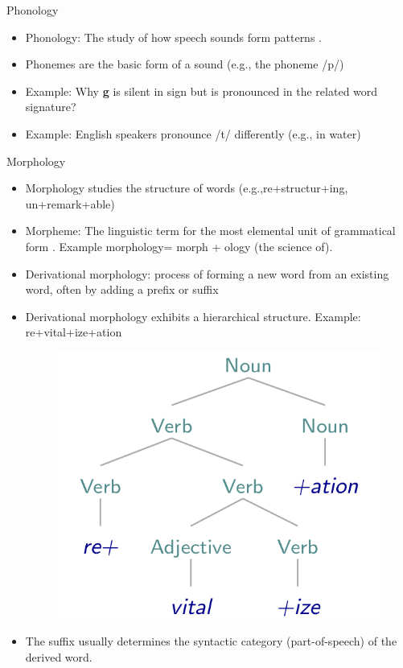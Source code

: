 \documentclass[handout]{beamer}
\begin{document}
\begin{frame}{Phonology}
\scriptsize{
\begin{itemize}
\item Phonology: The study of how speech sounds form patterns \cite{fromkin2018introduction}.
\item Phonemes are  the basic form of a sound (e.g., the phoneme /p/)
\item Example: Why \textbf{g} is silent in sign but is pronounced in the related word signature?
\item Example: English speakers pronounce /t/ differently (e.g., in water)
 
\end{itemize}
}
\end{frame}




\begin{frame}{Morphology}
\scriptsize{


\begin{itemize}
\item Morphology studies the structure of words (e.g.,re+structur+ing, un+remark+able) \cite{JohnsonMLSS}  
\item Morpheme: The linguistic term for the most elemental unit of grammatical form \cite{fromkin2018introduction}. Example morphology= morph + ology (the science of).
\item Derivational morphology: process of forming a new word from an existing word, often by adding a prefix or suffix 
\item Derivational morphology exhibits a hierarchical structure. Example: re+vital+ize+ation
     \begin{figure}[h]
        	\includegraphics[scale = 0.2]{pics/morphology.png}
        \end{figure}
\item The suffix usually determines the syntactic category (part-of-speech) of the derived word.        
\end{itemize}

}


\end{frame}
\end{document}
